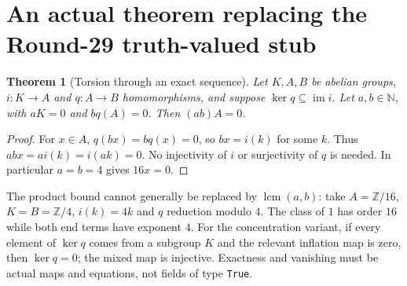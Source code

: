 \documentclass[11pt]{article}
\newtheorem{theorem}{Theorem}
\newcommand{\Z}{\mathbb Z}
\begin{document}
\section{An actual theorem replacing the Round-29 truth-valued stub}
\begin{theorem}[Torsion through an exact sequence]
Let $K,A,B$ be abelian groups, $i:K\to A$ and $q:A\to B$ homomorphisms,
and suppose $\ker q\subseteq\operatorname{im}i$.
Let $a,b\in\mathbb N$, with $aK=0$ and $bq(A)=0$.
Then $(ab)A=0$.
\end{theorem}
\begin{proof}
For $x\in A$, $q(bx)=bq(x)=0$, so $bx=i(k)$ for some $k$.
Thus $abx=ai(k)=i(ak)=0$. No injectivity of $i$ or surjectivity of $q$
is needed. In particular $a=b=4$ gives $16x=0$.
\end{proof}
The product bound cannot generally be replaced by $\operatorname{lcm}(a,b)$:
take $A=\Z/16$, $K=B=\Z/4$, $i(k)=4k$ and $q$ reduction modulo $4$.
The class of $1$ has order $16$ while both end terms have exponent $4$.
For the concentration variant, if every element of $\ker q$ comes from
a subgroup $K$ and the relevant inflation map is zero, then $\ker q=0$;
the mixed map is injective. Exactness and vanishing must be actual maps
and equations, not fields of type \texttt{True}.
\end{document}
